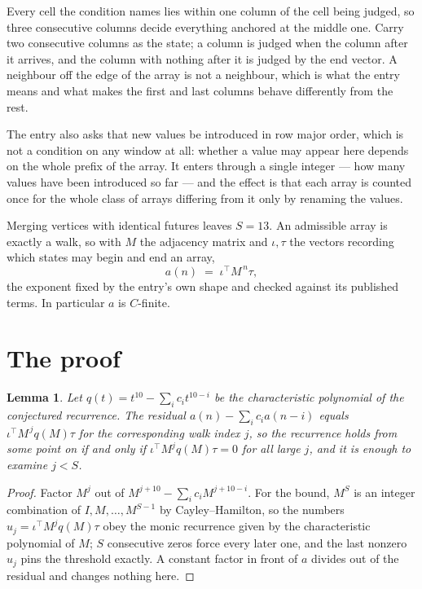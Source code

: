 \documentclass[11pt,a4paper]{article}
\theoremstyle{plain}
\newtheorem{lemma}[theorem]{Lemma}
\theoremstyle{definition}
\begin{document}
Every cell the condition names lies within one column of the cell being judged, so three consecutive columns decide everything anchored at the middle one. Carry two consecutive columns as the state; a column is judged when the column after it arrives, and the column with nothing after it is judged by the end vector. A neighbour off the edge of the array is not a neighbour, which is what the entry means and what makes the first and last columns behave differently from the rest.

The entry also asks that new values be introduced in row major order, which is not a condition on any window at all: whether a value may appear here depends on the whole prefix of the array. It enters through a single integer --- how many values have been introduced so far --- and the effect is that each array is counted once for the whole class of arrays differing from it only by renaming the values.

Merging vertices with identical futures leaves $S=13$. An admissible array is exactly a walk, so with $M$ the adjacency matrix and $\iota,\tau$ the vectors recording which states may begin and end an array,
\[
a(n)\;=\;\iota^{\!\top}M^{\,n}\tau ,
\]
the exponent fixed by the entry's own shape and checked against its published terms. In
particular $a$ is $C$-finite.

\section{The proof}

\begin{lemma}\label{lem:crit}
Let $q(t)=t^{10}-\sum_i c_it^{10-i}$ be the characteristic polynomial of the
conjectured recurrence. The residual $a(n)-\sum_ic_ia(n-i)$ equals
$\iota^{\!\top}M^{\,j}q(M)\tau$ for the corresponding walk index $j$, so the recurrence
holds from some point on if and only if $\iota^{\!\top}M^{j}q(M)\tau=0$ for all large $j$,
and it is enough to examine $j<S$.
\end{lemma}

\begin{proof}
Factor $M^{j}$ out of $M^{j+10}-\sum_ic_iM^{j+10-i}$. For the bound, $M^{S}$
is an integer combination of $I,M,\dots,M^{S-1}$ by Cayley--Hamilton, so the numbers
$u_j=\iota^{\!\top}M^{j}q(M)\tau$ obey the monic recurrence given by the characteristic
polynomial of $M$; $S$ consecutive zeros force every later one, and the last nonzero $u_j$
pins the threshold exactly. A constant factor in front of $a$ divides out of the residual and
changes nothing here.
\end{proof}
\end{document}
